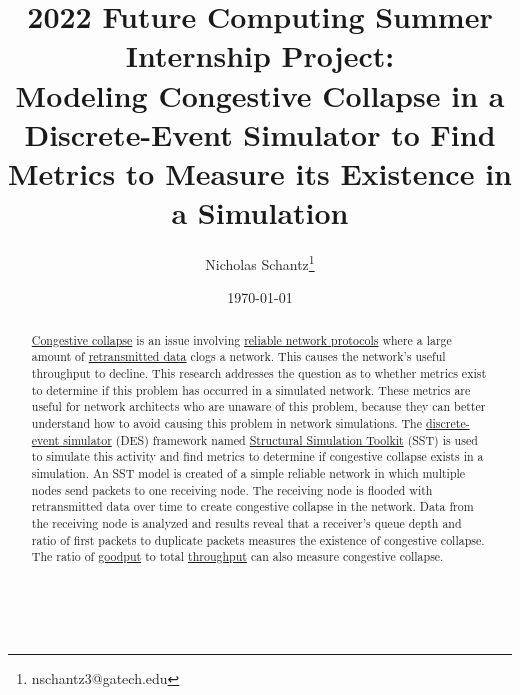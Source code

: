 \documentclass{article}
\begin{document}
        \title{2022 Future Computing Summer Internship Project:\\Modeling Congestive Collapse in a Discrete-Event Simulator to Find Metrics to Measure its Existence in a Simulation}
        \author{Nicholas Schantz\thanks{nschantz3@gatech.edu}}
        \date{\today}
            \maketitle
        \begin{abstract}
            \href{https://en.wikipedia.org/wiki/Network_congestion#Congestive_collapse}{Congestive collapse} is an issue involving \href{https://en.wikipedia.org/wiki/Reliability_(computer_networking}{reliable network protocols} where a large amount of \href{https://www.javatpoint.com/tcp-retransmission}{retransmitted data} clogs a network. This causes the network's useful throughput to decline. This research addresses the question as to whether metrics exist to determine if this problem has occurred in a simulated network. These metrics are useful for network architects who are unaware of this problem, because they can better understand how to avoid causing this problem in network simulations. The \href{https://en.wikipedia.org/wiki/Discrete-event_simulation}{discrete-event simulator} (DES) framework named \href{http://sst-simulator.org/}{Structural Simulation Toolkit} (SST) is used to simulate this activity and find metrics to determine if congestive collapse exists in a simulation. An SST model is created of a simple reliable network in which multiple nodes send packets to one receiving node. The receiving node is flooded with retransmitted data over time to create congestive collapse in the network. Data from the receiving node is analyzed and results reveal that a receiver's queue depth and ratio of first packets to duplicate packets  measures the existence of congestive collapse. The ratio of \href{https://en.wikipedia.org/wiki/Goodput}{goodput} to total \href{https://en.wikipedia.org/wiki/Network_throughput}{throughput} can also measure congestive collapse.
        \end{abstract}
\ \\

\end{document}

